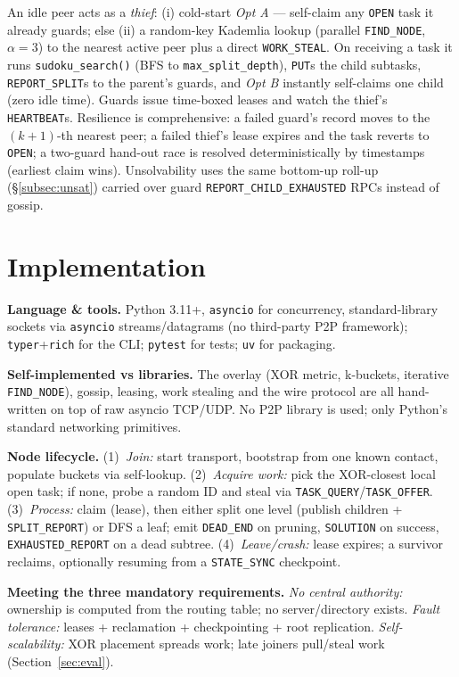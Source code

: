 \documentclass[11pt,a4paper]{article}
\newcommand{\code}[1]{\texttt{#1}}
\begin{document}
An idle peer acts as a \emph{thief}: (i) cold-start \emph{Opt A} --- self-claim any
\code{OPEN} task it already guards; else (ii) a random-key Kademlia lookup (parallel
\code{FIND\_NODE}, $\alpha=3$) to the nearest active peer plus a direct \code{WORK\_STEAL}.
On receiving a task it runs \code{sudoku\_search()} (BFS to \code{max\_split\_depth}),
\code{PUT}s the child subtasks, \code{REPORT\_SPLIT}s to the parent's guards, and
\emph{Opt B} instantly self-claims one child (zero idle time). Guards issue time-boxed
leases and watch the thief's \code{HEARTBEAT}s. Resilience is comprehensive: a failed
guard's record moves to the $(k{+}1)$-th nearest peer; a failed thief's lease expires and
the task reverts to \code{OPEN}; a two-guard hand-out race is resolved deterministically by
timestamps (earliest claim wins). Unsolvability uses the same bottom-up roll-up
(\S\ref{subsec:unsat}) carried over guard \code{REPORT\_CHILD\_EXHAUSTED} RPCs instead of
gossip.

\section{Implementation}\label{sec:impl}

\textbf{Language \& tools.} Python 3.11+, \code{asyncio} for concurrency, standard-library
sockets via \code{asyncio} streams/datagrams (no third-party P2P framework); \code{typer}+\code{rich}
for the CLI; \code{pytest} for tests; \code{uv} for packaging.

\textbf{Self-implemented vs libraries.} The overlay (XOR metric, k-buckets, iterative
\code{FIND\_NODE}), gossip, leasing, work stealing and the wire protocol are all hand-written on
top of raw asyncio TCP/UDP. No P2P library is used; only Python's standard networking primitives.

\textbf{Node lifecycle.} (1)~\emph{Join:} start transport, bootstrap from one known contact,
populate buckets via self-lookup. (2)~\emph{Acquire work:} pick the XOR-closest local open task;
if none, probe a random ID and steal via \code{TASK\_QUERY}/\code{TASK\_OFFER}. (3)~\emph{Process:}
claim (lease), then either split one level (publish children + \code{SPLIT\_REPORT}) or DFS a
leaf; emit \code{DEAD\_END} on pruning, \code{SOLUTION} on success, \code{EXHAUSTED\_REPORT} on a
dead subtree. (4)~\emph{Leave/crash:} lease expires; a survivor reclaims, optionally resuming from
a \code{STATE\_SYNC} checkpoint.

\textbf{Meeting the three mandatory requirements.} \emph{No central authority:} ownership is
computed from the routing table; no server/directory exists. \emph{Fault tolerance:} leases +
reclamation + checkpointing + root replication. \emph{Self-scalability:} XOR placement spreads
work; late joiners pull/steal work (Section~\ref{sec:eval}).
\end{document}
